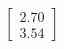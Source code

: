 \documentclass[preview]{standalone}
\begin{document}
\begin{align*}
\begin{bmatrix} 2.70 \\ 3.54 \end{bmatrix}
\end{align*}
\end{document}

